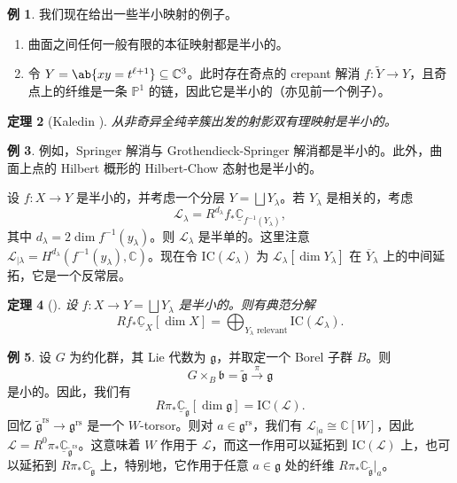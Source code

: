 \documentclass{amsart}
\newtheorem{thm}{定理}[section]
\theoremstyle{definition}
\newtheorem{exm}[thm]{例}
\newtheorem{exms}[thm]{例}
\theoremstyle{remark}
\theoremstyle{plain}
\theoremstyle{definition}
\theoremstyle{remark}
\newcommand{\C}{\mathbb{C}}
\renewcommand{\P}{\mathbb{P}}
\newcommand{\g}{\mathfrak{g}}
\renewcommand{\b}{\mathfrak{b}}
\newcommand{\mc}[1]{\mathcal{#1}}
\newcommand{\mr}[1]{\mathrm{#1}}
\newcommand{\on}[1]{\operatorname{#1}}
\newcommand{\ol}[1]{\overline{#1}}
\newcommand{\ul}[1]{\underline{#1}}
\newcommand{\1}{\mathbf{1}}
\newcommand{\2}{\mathbf{2}}
\newcommand{\3}{\mathbf{3}}
\begin{document}
\begin{exms}
    我们现在给出一些半小映射的例子。
    \begin{enumerate}
        \item 曲面之间任何一般有限的本征映射都是半小的。
        \item 令 \(Y = \ab\{xy = t^{\ell+1}\} \subseteq \C^3\)。此时存在奇点的 crepant 解消 \(f \colon \tilde{Y} \to Y\)，且奇点上的纤维是一条 \(\P^1\) 的链，因此它是半小的（亦见前一个例子）。
    \end{enumerate}
\end{exms}

\begin{thm}[Kaledin {\cite{Kaledin2006}}]
    从非奇异全纯辛簇出发的射影双有理映射是半小的。
\end{thm}

\begin{exm}
    例如，Springer 解消与 Grothendieck-Springer 解消都是半小的。此外，曲面上点的 Hilbert 概形的 Hilbert-Chow 态射也是半小的。
\end{exm}

设 \(f \colon X \to Y\) 是半小的，并考虑一个分层 \(Y = \bigsqcup Y_{\lambda}\)。若 \(Y_{\lambda}\) 是相关的，考虑
\[ \mc{L}_{\lambda} = R^{d_{\lambda}} f_* \ul{\C}_{f^{-1}(Y_{\lambda})}, \]
其中 \(d_{\lambda} = 2 \dim f^{-1} (y_{\lambda})\)。则 \(\mc{L}_{\lambda}\) 是半单的。这里注意 \(\mc{L}_{|\lambda} = H^{d_{\lambda}}(f^{-1}(y_{\lambda}), \C)\)。现在令 \(\mr{IC}(\mc{L}_{\lambda})\) 为 \(\mc{L}_{\lambda}[\dim Y_{\lambda}]\) 在 \(\ol{Y}_{\lambda}\) 上的中间延拓，它是一个反常层。

\begin{thm}[{\cite{DeCataldoMigliorini2002}}]
    设 \(f \colon X \to Y = \bigsqcup Y_{\lambda}\) 是半小的。则有典范分解
    \[ R f_* \ul{\C}_X[\dim X] = \bigoplus_{Y_{\lambda}\text{ relevant}} \mr{IC}(\mc{L}_{\lambda}). \]
\end{thm}

\begin{exm}
    设 \(G\) 为约化群，其 Lie 代数为 \(\g\)，并取定一个 Borel 子群 \(B\)。则
    \[ G \times_B \b = \tilde{\g} \xrightarrow{\pi} \g \]
    是小的。因此，我们有
    \[ R \pi_* \ul{\C}_{\tilde{\g}} [\dim \g] = \mr{IC}(\mc{L}). \]
    回忆 \(\tilde{\g}^{\on{rs}} \to \g^{\on{rs}}\) 是一个 \(W\)-torsor。则对 \(a \in \g^{\on{rs}}\)，我们有 \(\mc{L}_{|a} \cong \C[W]\)，因此 \(\mc{L} = R^0 \pi_* \ul{\C}_{\tilde{\g}^{\on{rs}}}\)。这意味着 \(W\) 作用于 \(\mc{L}\)，而这一作用可以延拓到 \(\mr{IC}(\mc{L})\) 上，也可以延拓到 \(R \pi_* \C_{\tilde{\g}}\) 上，特别地，它作用于任意 \(a \in \g\) 处的纤维 \(R \pi_* \C_{\tilde{\g}}|_a\)。
\end{exm}
\end{document}
